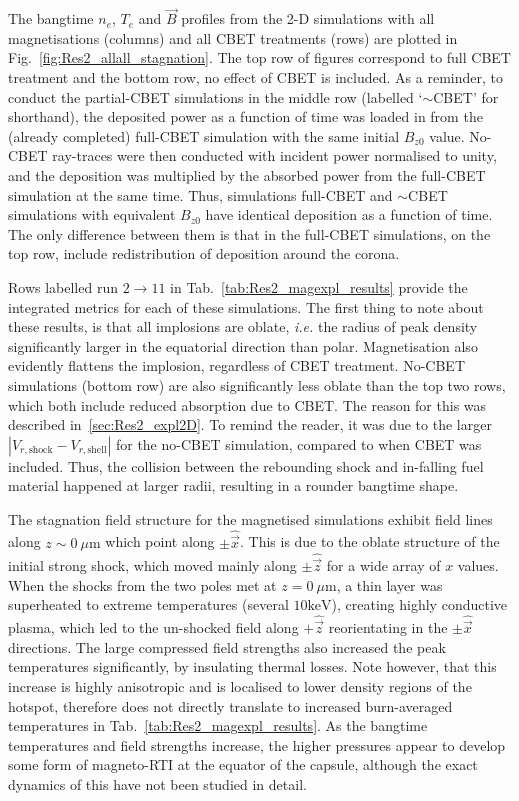 The bangtime $n_e$, $T_e$ and $\vec{B}$ profiles from the 2-D simulations with all magnetisations (columns) and all \ac{CBET} treatments (rows) are plotted in Fig.~\ref{fig:Res2_allall_stagnation}.
The top row of figures correspond to full \ac{CBET} treatment and the bottom row, no effect of \ac{CBET} is included.
As a reminder, to conduct the partial-\ac{CBET} simulations in the middle row (labelled `$\sim$\ac{CBET}' for shorthand), the deposited power as a function of time was loaded in from the (already completed) full-\ac{CBET} simulation with the same initial $B_{z0}$ value.
No-\ac{CBET} ray-traces were then conducted with incident power normalised to unity, and the deposition was multiplied by the absorbed power from the full-\ac{CBET} simulation at the same time.
Thus, simulations full-\ac{CBET} and $\sim$\ac{CBET} simulations with equivalent $B_{z0}$ have identical deposition as a function of time.
The only difference between them is that in the full-\ac{CBET} simulations, on the top row, include redistribution of deposition around the corona.

Rows labelled run $2\rightarrow11$ in Tab.~\ref{tab:Res2_magexpl_results} provide the integrated metrics for each of these simulations.
The first thing to note about these results, is that all implosions are oblate, \textit{i.e.} the radius of peak density significantly larger in the equatorial direction than polar.
Magnetisation also evidently flattens the implosion, regardless of \ac{CBET} treatment.
No-\ac{CBET} simulations (bottom row) are also significantly less oblate than the top two rows, which both include reduced absorption due to \ac{CBET}.
The reason for this was described in~\ref{sec:Res2_expl2D}.
To remind the reader, it was due to the larger $|V_{r,\text{shock}} - V_{r,\text{shell}}|$ for the no-\ac{CBET} simulation, compared to when \ac{CBET} was included.
Thus, the collision between the rebounding shock and in-falling fuel material happened at larger radii, resulting in a rounder bangtime shape.

The stagnation field structure for the magnetised simulations exhibit field lines along $z\sim0\ \mu\text{m}$ which point along $\pm\hat{\vec{x}}$.
This is due to the oblate structure of the initial strong shock, which moved mainly along $\pm\hat{\vec{z}}$ for a wide array of $x$ values.
When the shocks from the two poles met at $z=0\ \mu\text{m}$, a thin layer was superheated to extreme temperatures (several $10 \text{keV}$), creating highly conductive plasma, which led to the un-shocked field along $+\hat{\vec{z}}$ reorientating in the $\pm\hat{\vec{x}}$ directions.
The large compressed field strengths also increased the peak temperatures significantly, by insulating thermal losses.
Note however, that this increase is highly anisotropic and is localised to lower density regions of the hotspot, therefore does not directly translate to increased burn-averaged temperatures in Tab.~\ref{tab:Res2_magexpl_results}.
As the bangtime temperatures and field strengths increase, the higher pressures appear to develop some form of magneto-\ac{RTI} at the equator of the capsule, although the exact dynamics of this have not been studied in detail.

